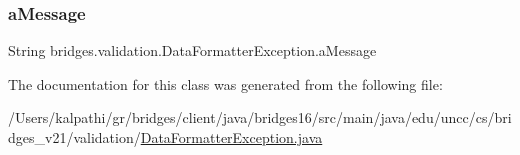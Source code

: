 \subsubsection{\texorpdfstring{a\+Message}{aMessage}}
{\footnotesize\ttfamily String bridges.\+validation.\+Data\+Formatter\+Exception.\+a\+Message}



The documentation for this class was generated from the following file\+:\begin{DoxyCompactItemize}
\item 
/\+Users/kalpathi/gr/bridges/client/java/bridges16/src/main/java/edu/uncc/cs/bridges\+\_\+v21/validation/\hyperlink{_data_formatter_exception_8java}{Data\+Formatter\+Exception.\+java}\end{DoxyCompactItemize}
